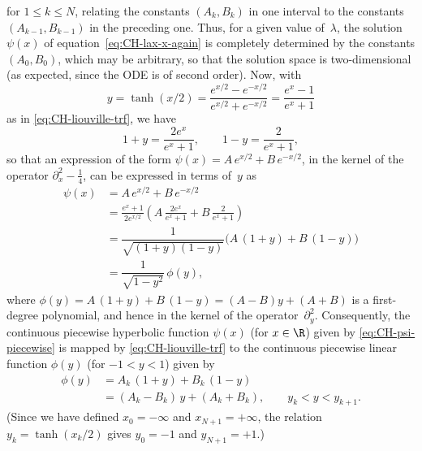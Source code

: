 \documentclass[10pt,a4paper]{article} \pdfoutput=1 
\begin{document}
for $1 \le k \le N$,
relating the constants $(A_k, B_k)$ in one interval to the constants $(A_{k-1},B_{k-1})$
in the preceding one.
Thus, for a given value of~$\lambda$,
the solution $\psi(x)$ of equation~\eqref{eq:CH-lax-x-again}
is completely determined by the constants $(A_0,B_0)$,
which may be arbitrary, so that the solution space is two-dimensional
(as expected, since the ODE is of second order).
Now, with
\begin{equation*}
  y = \tanh(x/2)
  = \frac{e^{x/2} - e^{-x/2}}{e^{x/2} + e^{-x/2}}
  = \frac{e^x-1}{e^x+1}
\end{equation*}
as in \eqref{eq:CH-liouville-trf},
we have
\begin{equation*}
  1+y = \frac{2 e^x}{e^x+1}
  , \qquad
  1-y = \frac{2}{e^x+1}
  ,
\end{equation*}
so that an expression of the form
$\psi(x) = A \, e^{x/2} + B \, e^{-x/2}$,
in the kernel of the operator $\partial_x^2 - \tfrac14$,
can be expressed in terms of~$y$ as
\begin{equation*}
  \begin{split}
    \psi(x) &= A \, e^{x/2} + B \, e^{-x/2}
    \\ &
    = \frac{e^x+1}{2e^{x/2}} \left( A \, \frac{2e^x}{e^x+1} + B \, \frac{2}{e^x+1} \right)
    \\ &
    = \dfrac{1}{\sqrt{(1+y)(1-y)}}
    \biggl( A \, (1+y) + B \, (1-y) \biggr)
    \\ &
    = \dfrac{1}{\sqrt{1-y^2}} \, \phi(y)
    ,
  \end{split}
\end{equation*}
where $\phi(y) = A \, (1+y) + B \, (1-y) = (A-B) y + (A+B)$ is a first-degree polynomial,
and hence in the kernel of the operator~$\partial_y^2$.
Consequently, the continuous piecewise hyperbolic function $\psi(x)$ (for $x \in \R$)
given by \eqref{eq:CH-psi-piecewise}
is mapped by \eqref{eq:CH-liouville-trf}
to the continuous piecewise linear function $\phi(y)$ (for $-1 < y < 1$) given by
\begin{equation}
  \label{eq:CH-phi-piecewise}
  \begin{split}
    \phi(y) &
    = A_k \, (1+y) + B_k \, (1-y)
    \\ &
    =  (A_k - B_k) \, y + (A_k + B_k)
    ,\qquad
    y_k < y < y_{k+1}
    .
  \end{split}
\end{equation}
(Since we have defined $x_0 = -\infty$ and $x_{N+1} = +\infty$,
the relation $y_k = \tanh(x_k/2)$ gives $y_0 = -1$ and $y_{N+1} = +1$.)
\end{document}
